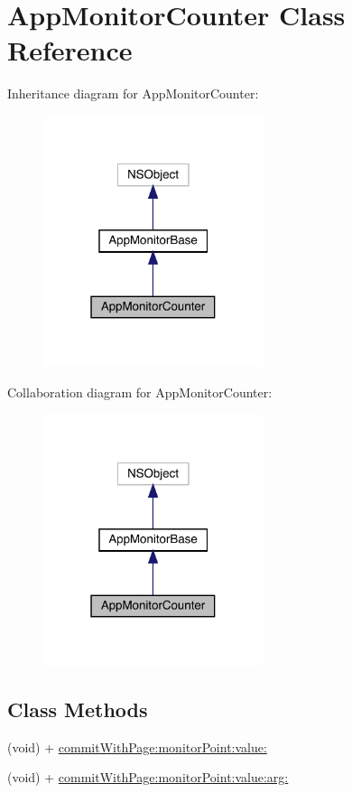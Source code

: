 \hypertarget{interface_app_monitor_counter}{}\section{App\+Monitor\+Counter Class Reference}
\label{interface_app_monitor_counter}


Inheritance diagram for App\+Monitor\+Counter\+:\nopagebreak
\begin{figure}[H]
\begin{center}
\leavevmode
\includegraphics[width=183pt]{interface_app_monitor_counter__inherit__graph}
\end{center}
\end{figure}


Collaboration diagram for App\+Monitor\+Counter\+:\nopagebreak
\begin{figure}[H]
\begin{center}
\leavevmode
\includegraphics[width=183pt]{interface_app_monitor_counter__coll__graph}
\end{center}
\end{figure}
\subsection*{Class Methods}
\begin{DoxyCompactItemize}
\item 
(void) + \mbox{\hyperlink{interface_app_monitor_counter_ae6cf19917834e8e0dbb37083b587f295}{commit\+With\+Page\+:monitor\+Point\+:value\+:}}
\item 
(void) + \mbox{\hyperlink{interface_app_monitor_counter_a319edfa4e4f5cae4c9b2c1fa60a36243}{commit\+With\+Page\+:monitor\+Point\+:value\+:arg\+:}}
\end{DoxyCompactItemize}


